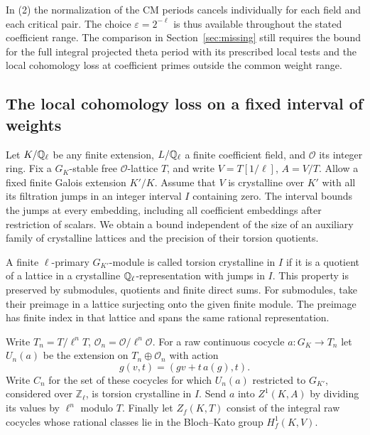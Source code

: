 \documentclass[a4paper,11pt]{article}
\theoremstyle{definition}
\theoremstyle{remark}
\newcommand{\ZZ}{\mathbb Z}\newcommand{\ord}{\operatorname{ord}}
\numberwithin{equation}{section}
\begin{document}
In (2) the normalization of the CM periods cancels individually
for each field and each critical pair. The choice
\(\varepsilon=2^{-\ell}\) is thus available throughout the stated
coefficient range. The comparison in Section~\ref{sec:missing}
still requires the bound for the full integral projected theta
period with its prescribed local tests and the local cohomology
loss at coefficient primes outside the common weight range.
\clearpage

\subsection{The local cohomology loss on a fixed interval of weights}
\label{sec:localfinite732}

Let \(K/\mathbb Q_\ell\) be any finite extension, \(L/\mathbb Q_\ell\) a finite
coefficient field, and \(\mathcal O\) its integer ring. Fix a
\(G_K\)-stable free \(\mathcal O\)-lattice \(T\), and write
\(V=T[1/\ell]\), \(A=V/T\). Allow a fixed finite Galois extension
\(K'/K\). Assume that \(V\) is crystalline over \(K'\) with all its
filtration jumps in an integer interval \(I\) containing zero.
The interval bounds the jumps at every embedding, including all
coefficient embeddings after restriction of scalars. We obtain a
bound independent of the size of an auxiliary family of crystalline
lattices and the precision of their torsion quotients.

A finite \(\ell\)-primary \(G_{K'}\)-module is called torsion
crystalline in \(I\) if it is a quotient of a lattice in a
crystalline \(\mathbb Q_\ell\)-representation with jumps in \(I\).
This property is preserved by submodules, quotients and finite
direct sums. For submodules, take their preimage in a lattice
surjecting onto the given finite module. The preimage has finite
index in that lattice and spans the same rational representation.

Write \(T_n=T/\ell^nT\), \(\mathcal O_n=\mathcal O/\ell^n\mathcal O\).
For a raw continuous cocycle \(a:G_K\to T_n\) let \(U_n(a)\)
be the extension on \(T_n\oplus\mathcal O_n\) with action
\[
            g(v,t)=(gv+t\,a(g),t).
\]
Write \(C_n\) for the set of these cocycles for which \(U_n(a)\)
restricted to \(G_{K'}\), considered over \(\ZZ_\ell\), is torsion
crystalline in \(I\). Send \(a\) into \(Z^1(K,A)\) by dividing
its values by \(\ell^n\) modulo \(T\). Finally let \(Z_f(K,T)\)
consist of the integral raw cocycles whose rational classes lie
in the Bloch--Kato group \(H^1_f(K,V)\).
\end{document}
